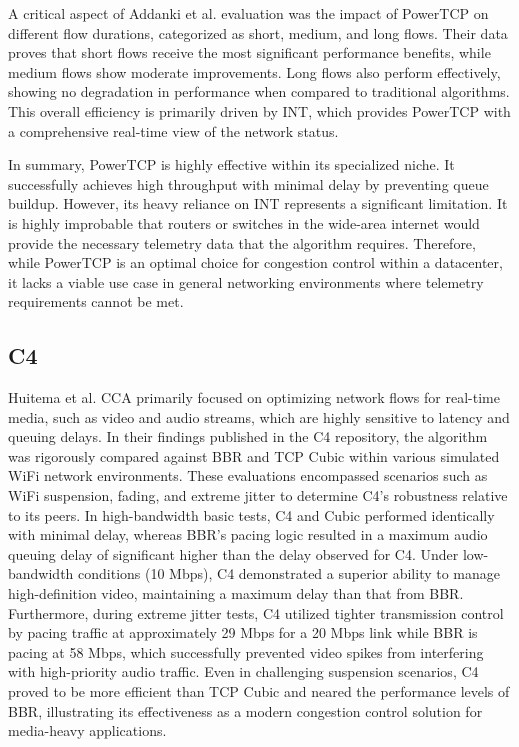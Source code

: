 A critical aspect of Addanki et al. evaluation was the impact of PowerTCP on different flow durations, categorized as short, medium, and long flows. 
Their data proves that short flows receive the most significant performance benefits, while medium flows show moderate improvements. 
Long flows also perform effectively, showing no degradation in performance when compared to traditional algorithms. 
This overall efficiency is primarily driven by INT, which provides PowerTCP with a comprehensive real-time view of the network status.

In summary, PowerTCP is highly effective within its specialized niche. 
It successfully achieves high throughput with minimal delay by preventing queue buildup. 
However, its heavy reliance on INT represents a significant limitation.
It is highly improbable that routers or switches in the wide-area internet would provide the necessary telemetry data that the algorithm requires. 
Therefore, while PowerTCP is an optimal choice for congestion control within a datacenter, it lacks a viable use case in general networking environments where telemetry requirements cannot be met.

\subsection{C4}

Huitema et al. \ac{CCA} primarily focused on optimizing network flows for real-time media, such as video and audio streams, which are highly sensitive to latency and queuing delays. 
In their findings published in the C4 repository\cite{C4GithubRepo}, the algorithm was rigorously compared against BBR and TCP Cubic within various simulated WiFi network environments. 
These evaluations encompassed scenarios such as WiFi suspension, fading, and extreme jitter to determine C4's robustness relative to its peers. 
In high-bandwidth basic tests, C4 and Cubic performed identically with minimal delay, whereas BBR's pacing logic resulted in a maximum audio queuing delay of significant higher than the delay observed for C4. 
Under low-bandwidth conditions (10 Mbps), C4 demonstrated a superior ability to manage high-definition video, maintaining a maximum delay than that from BBR. 
Furthermore, during extreme jitter tests, C4 utilized tighter transmission control by pacing traffic at approximately 29 Mbps for a 20 Mbps link while BBR is pacing at 58 Mbps, which successfully prevented video spikes from interfering with high-priority audio traffic. 
Even in challenging suspension scenarios, C4 proved to be more efficient than TCP Cubic and neared the performance levels of BBR, illustrating its effectiveness as a modern congestion control solution for media-heavy applications.


